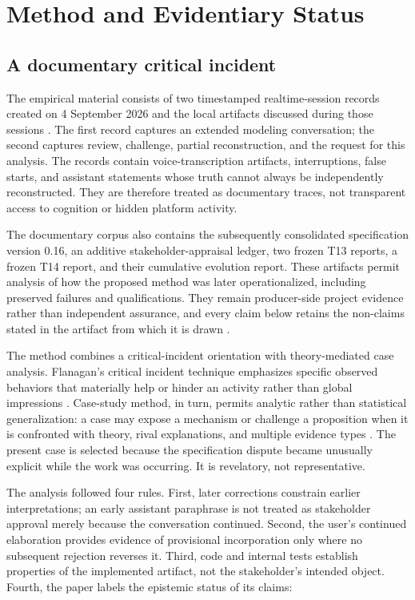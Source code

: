 \documentclass[10pt,a4paper]{article}
\begin{document}
\section{Method and Evidentiary Status}

\subsection{A documentary critical incident}

The empirical material consists of two timestamped realtime-session records created on 4 September 2026 and the local artifacts discussed during those sessions \cite{sessionrecord}. The first record captures an extended modeling conversation; the second captures review, challenge, partial reconstruction, and the request for this analysis. The records contain voice-transcription artifacts, interruptions, false starts, and assistant statements whose truth cannot always be independently reconstructed. They are therefore treated as documentary traces, not transparent access to cognition or hidden platform activity.

The documentary corpus also contains the subsequently consolidated specification version 0.16, an additive stakeholder-appraisal ledger, two frozen T13 reports, a frozen T14 report, and their cumulative evolution report. These artifacts permit analysis of how the proposed method was later operationalized, including preserved failures and qualifications. They remain producer-side project evidence rather than independent assurance, and every claim below retains the non-claims stated in the artifact from which it is drawn \cite{ctxspec016,stakeholderledger,t13v1report,t13v2report,t14report,ctxevolution}.

The method combines a critical-incident orientation with theory-mediated case analysis. Flanagan's critical incident technique emphasizes specific observed behaviors that materially help or hinder an activity rather than global impressions \cite{flanagan1954}. Case-study method, in turn, permits analytic rather than statistical generalization: a case may expose a mechanism or challenge a proposition when it is confronted with theory, rival explanations, and multiple evidence types \cite{flyvbjerg2006,yin2013}. The present case is selected because the specification dispute became unusually explicit while the work was occurring. It is revelatory, not representative.

The analysis followed four rules. First, later corrections constrain earlier interpretations; an early assistant paraphrase is not treated as stakeholder approval merely because the conversation continued. Second, the user's continued elaboration provides evidence of provisional incorporation only where no subsequent rejection reverses it. Third, code and internal tests establish properties of the implemented artifact, not the stakeholder's intended object. Fourth, the paper labels the epistemic status of its claims:
\end{document}

